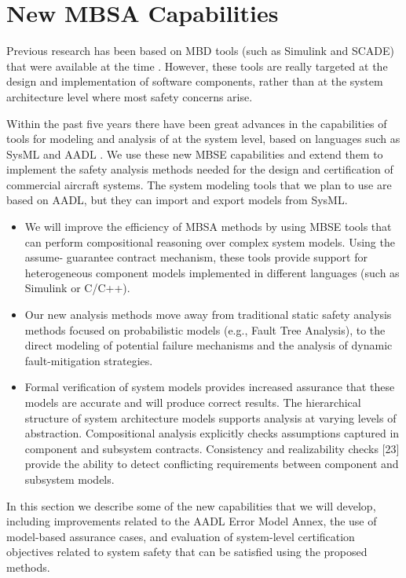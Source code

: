\section{New MBSA Capabilities}

Previous research has been based on MBD tools (such as Simulink and SCADE) that were available at the time \cite{Joshi05:Dasc}. However, these tools are really targeted at the design and implementation of software components, rather than at the system architecture level where most safety concerns arise.

Within the past five years there have been great advances in the capabilities of tools for modeling and analysis of at the system level, based on languages such as SysML \cite{SysML} and AADL \cite{AADL}. We use these new MBSE capabilities and extend them to implement the safety analysis methods needed for the design and certification of commercial aircraft systems. The system modeling tools that we plan to use are based on AADL, but they can import and export models from SysML.

\begin{itemize}
\item We will improve the efficiency of MBSA methods by using MBSE tools that can perform compositional reasoning over complex system models. Using the assume- guarantee contract mechanism, these tools provide support for heterogeneous component models implemented in different languages (such as Simulink or C/C++).

\item Our new analysis methods move away from traditional static safety analysis methods focused on probabilistic models (e.g., Fault Tree Analysis), to the direct modeling of potential failure mechanisms and the analysis of dynamic fault-mitigation strategies.

\item Formal verification of system models provides increased assurance that these models are accurate and will produce correct results. The hierarchical structure of system architecture models supports analysis at varying levels of abstraction. Compositional analysis explicitly checks assumptions captured in component and subsystem contracts. Consistency and realizability checks [23] provide the ability to detect conflicting requirements between component and subsystem models.
\end{itemize}

In this section we describe some of the new capabilities that we will develop, including improvements related to the AADL Error Model Annex, the use of model-based assurance cases, and evaluation of system-level certification objectives related to system safety that can be satisfied using the proposed methods.

